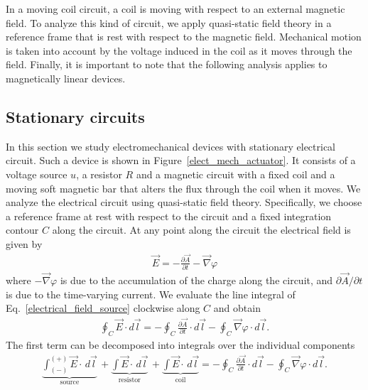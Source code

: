 \documentclass[11pt,a4paper,oneside]{book}
\numberwithin{equation}{section}
\theoremstyle{it}
\theoremstyle{definition}
\begin{document}
In a moving coil circuit, a coil is moving with respect to an external magnetic field. To analyze this kind of circuit, we apply quasi-static field theory in a reference frame that is rest with respect to the magnetic field. Mechanical motion is taken into account by the voltage induced in the coil as it moves through the field. Finally, it is important to note that the following analysis applies to magnetically linear devices.
\subsection{Stationary circuits}
In this section we study electromechanical devices with stationary electrical circuit. Such a device is shown in Figure~\ref{elect_mech_actuator}. It consists of a voltage source $u$, a resistor $R$ and a magnetic circuit with a fixed coil and a moving soft magnetic bar that alters the flux through the coil when it moves. We analyze the electrical circuit using quasi-static field theory. Specifically, we choose a reference frame at rest with respect to the circuit and a fixed integration contour $C$ along the circuit. At any point along the circuit the electrical field is given by 
\begin{equation}\label{electrical_field_source}
	\begin{aligned}
		\vec{E} = -\frac{\partial \vec{A}}{\partial t} - \vec{\nabla}\varphi
	\end{aligned}
\end{equation} 
where $-\vec{\nabla}\varphi$ is due to the accumulation of the charge along the circuit, and $\partial \vec{A}/\partial t$ is due to the time-varying current. We evaluate the line integral of Eq.~\eqref{electrical_field_source} clockwise along $C$ and obtain
\begin{equation*}\label{}
	\begin{aligned}
		\oint_{C} \vec{E}\cdot d\vec{l} = -\oint_{C} \frac{\partial \vec{A}}{\partial t}\cdot d\vec{l} - \oint_{C}\vec{\nabla}\varphi\cdot d\vec{l}.
	\end{aligned}
\end{equation*} 
The first term can be decomposed into integrals over the individual components
\begin{equation}\label{faraday_path}
	\begin{aligned}
		\underbrace{\int_{(-)}^{(+)}\vec{E}\cdot\,d\vec{l}}_{\text{source}} \, + \underbrace{\int\vec{E}\cdot\,d\vec{l}}_{\text{resistor}} \, + 
		\underbrace{\int\vec{E}\cdot\,d\vec{l}}_{\text{coil}} = -\oint_{C} \frac{\partial \vec{A}}{\partial t}\cdot d\vec{l} - \oint_{C}\vec{\nabla}\varphi\cdot d\vec{l}.
	\end{aligned}
\end{equation} 
\end{document}
